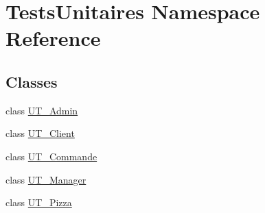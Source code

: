 \hypertarget{namespaceTestsUnitaires}{}\section{Tests\+Unitaires Namespace Reference}
\label{namespaceTestsUnitaires}
\subsection*{Classes}
\begin{DoxyCompactItemize}
\item 
class \hyperlink{classTestsUnitaires_1_1UT__Admin}{U\+T\+\_\+\+Admin}
\item 
class \hyperlink{classTestsUnitaires_1_1UT__Client}{U\+T\+\_\+\+Client}
\item 
class \hyperlink{classTestsUnitaires_1_1UT__Commande}{U\+T\+\_\+\+Commande}
\item 
class \hyperlink{classTestsUnitaires_1_1UT__Manager}{U\+T\+\_\+\+Manager}
\item 
class \hyperlink{classTestsUnitaires_1_1UT__Pizza}{U\+T\+\_\+\+Pizza}
\end{DoxyCompactItemize}
